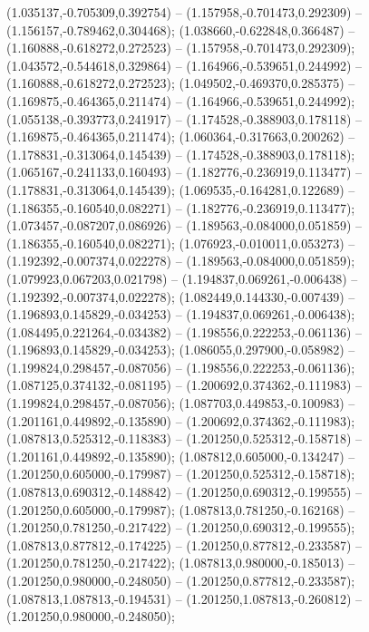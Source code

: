  (1.035137,-0.705309,0.392754) -- (1.157958,-0.701473,0.292309) -- (1.156157,-0.789462,0.304468);
 (1.038660,-0.622848,0.366487) -- (1.160888,-0.618272,0.272523) -- (1.157958,-0.701473,0.292309);
 (1.043572,-0.544618,0.329864) -- (1.164966,-0.539651,0.244992) -- (1.160888,-0.618272,0.272523);
 (1.049502,-0.469370,0.285375) -- (1.169875,-0.464365,0.211474) -- (1.164966,-0.539651,0.244992);
 (1.055138,-0.393773,0.241917) -- (1.174528,-0.388903,0.178118) -- (1.169875,-0.464365,0.211474);
 (1.060364,-0.317663,0.200262) -- (1.178831,-0.313064,0.145439) -- (1.174528,-0.388903,0.178118);
 (1.065167,-0.241133,0.160493) -- (1.182776,-0.236919,0.113477) -- (1.178831,-0.313064,0.145439);
 (1.069535,-0.164281,0.122689) -- (1.186355,-0.160540,0.082271) -- (1.182776,-0.236919,0.113477);
 (1.073457,-0.087207,0.086926) -- (1.189563,-0.084000,0.051859) -- (1.186355,-0.160540,0.082271);
 (1.076923,-0.010011,0.053273) -- (1.192392,-0.007374,0.022278) -- (1.189563,-0.084000,0.051859);
 (1.079923,0.067203,0.021798) -- (1.194837,0.069261,-0.006438) -- (1.192392,-0.007374,0.022278);
 (1.082449,0.144330,-0.007439) -- (1.196893,0.145829,-0.034253) -- (1.194837,0.069261,-0.006438);
 (1.084495,0.221264,-0.034382) -- (1.198556,0.222253,-0.061136) -- (1.196893,0.145829,-0.034253);
 (1.086055,0.297900,-0.058982) -- (1.199824,0.298457,-0.087056) -- (1.198556,0.222253,-0.061136);
 (1.087125,0.374132,-0.081195) -- (1.200692,0.374362,-0.111983) -- (1.199824,0.298457,-0.087056);
 (1.087703,0.449853,-0.100983) -- (1.201161,0.449892,-0.135890) -- (1.200692,0.374362,-0.111983);
 (1.087813,0.525312,-0.118383) -- (1.201250,0.525312,-0.158718) -- (1.201161,0.449892,-0.135890);
 (1.087812,0.605000,-0.134247) -- (1.201250,0.605000,-0.179987) -- (1.201250,0.525312,-0.158718);
 (1.087813,0.690312,-0.148842) -- (1.201250,0.690312,-0.199555) -- (1.201250,0.605000,-0.179987);
 (1.087813,0.781250,-0.162168) -- (1.201250,0.781250,-0.217422) -- (1.201250,0.690312,-0.199555);
 (1.087813,0.877812,-0.174225) -- (1.201250,0.877812,-0.233587) -- (1.201250,0.781250,-0.217422);
 (1.087813,0.980000,-0.185013) -- (1.201250,0.980000,-0.248050) -- (1.201250,0.877812,-0.233587);
 (1.087813,1.087813,-0.194531) -- (1.201250,1.087813,-0.260812) -- (1.201250,0.980000,-0.248050);
